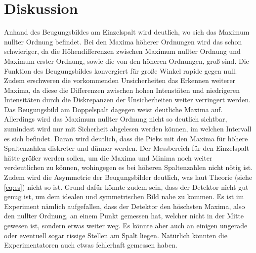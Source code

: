 \section{Diskussion}

Anhand des Beugungsbildes am Einzelspalt wird deutlich, wo sich das Maximum nullter Ordnung befindet. Bei den Maxima höherer Ordnungen wird das schon schwieriger, da die Höhendifferenzen zwischen Maximum nullter Ordnung und Maximum erster Ordnung, sowie die von den höheren Ordnungen, groß sind. Die Funktion des Beugungsbildes konvergiert für große Winkel rapide gegen null. Zudem erschweren die vorkommenden Unsicherheiten das Erkennen weiterer Maxima, da diese die Differenzen zwischen hohen Intenstäten und niedrigeren Intensitäten durch die Diskrepanzen der Unsicherheiten weiter verringert werden.\\
Das Beugungsbild am Doppelspalt dagegen weist deutliche Maxima auf. Allerdings wird das Maximum nullter Ordnung nicht so deutlich sichtbar, zumindest wird nur mit Sicherheit abgelesen werden können, im welchen Intervall es sich befindet. Daran wird deutlich, dass die Pieks mit den Maxima für höhere Spaltenzahlen diskreter und dünner werden. Der Messbereich für den Einzelspalt hätte größer werden sollen, um die Maxima und Minima noch weiter verdeutlichen zu können, wohingegen es bei höheren Spaltenzahlen nicht nötig ist. Zudem wird die Asymmetrie der Beugungsbilder deutlich, was laut Theorie (siehe \autoref{eq:es}) nicht so ist. Grund dafür könnte zudem sein, dass der Detektor nicht gut genug ist, um dem idealen und symmetrischen Bild nahe zu kommen. Es ist im Experiment nämlich aufgefallen, dass der Detektor den höschsten Maxima, also den nullter Ordnung, an einem Punkt gemessen hat, welcher nicht in der Mitte gewesen ist, sondern etwas weiter weg. Es könnte aber auch an einigen ungerade oder eventuell sogar rissige Stellen am Spalt liegen. Natürlich könnten die Experimentatoren auch etwas fehlerhaft gemessen haben. 

\label{sec:Diskussion}
